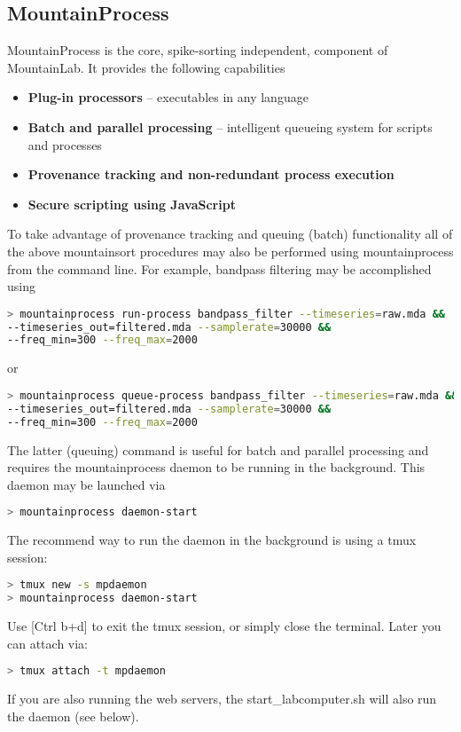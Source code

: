\documentclass{article}
\begin{document}
\subsection{MountainProcess}

MountainProcess is the core, spike-sorting independent, component of MountainLab. It provides the following capabilities
\begin{itemize}
\item{\textbf{Plug-in processors} -- executables in any language}
\item{\textbf{Batch and parallel processing} -- intelligent queueing system for scripts and processes}
\item{\textbf{Provenance tracking and non-redundant process execution}}
\item{\textbf{Secure scripting using JavaScript}}
\end{itemize}

To take advantage of provenance tracking and queuing (batch) functionality all of the above mountainsort procedures may also be performed using mountainprocess from the command line. For example, bandpass filtering may be accomplished using
\begin{lstlisting}[language=bash]
> mountainprocess run-process bandpass_filter --timeseries=raw.mda &&
--timeseries_out=filtered.mda --samplerate=30000 &&
--freq_min=300 --freq_max=2000
\end{lstlisting}
or
\begin{lstlisting}[language=bash]
> mountainprocess queue-process bandpass_filter --timeseries=raw.mda &&
--timeseries_out=filtered.mda --samplerate=30000 &&
--freq_min=300 --freq_max=2000
\end{lstlisting}

The latter (queuing) command is useful for batch and parallel processing and requires the mountainprocess daemon to be running in the background. This daemon may be launched via
\begin{lstlisting}[language=bash]
> mountainprocess daemon-start
\end{lstlisting}
The recommend way to run the daemon in the background is using a tmux session:
\begin{lstlisting}[language=bash]
> tmux new -s mpdaemon
> mountainprocess daemon-start
\end{lstlisting}
Use [Ctrl b+d] to exit the tmux session, or simply close the terminal. Later you can attach via:
\begin{lstlisting}[language=bash]
> tmux attach -t mpdaemon
\end{lstlisting}
If you are also running the web servers, the start\_labcomputer.sh will also run the daemon (see below).
\end{document}

